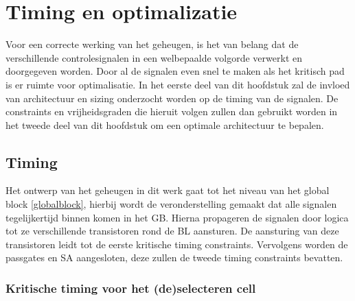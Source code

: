 \chapter{Timing en optimalizatie}
\label{timing-optimization}
Voor een correcte werking van het geheugen, is het van belang dat de verschillende controlesignalen in een welbepaalde volgorde verwerkt en doorgegeven worden.
Door al de signalen even snel te maken als het kritisch pad is er ruimte voor optimalisatie. In het eerste deel van dit hoofdstuk zal de invloed van architectuur en sizing onderzocht worden op de timing van de signalen. De constraints en vrijheidsgraden die hieruit volgen zullen dan gebruikt worden in het tweede deel van dit hoofdstuk om een optimale architectuur te bepalen.

\section{Timing}
\label{timing}
Het ontwerp van het geheugen in dit werk gaat tot het niveau van het global block \ref{globalblock}, hierbij wordt de veronderstelling gemaakt dat alle signalen tegelijkertijd binnen komen in het GB. Hierna propageren de signalen door logica tot ze verschillende transistoren rond de BL aansturen. De aansturing van deze transistoren leidt tot de eerste kritische timing constraints. Vervolgens worden de passgates en SA aangesloten, deze zullen de tweede timing constraints bevatten.

\subsection{Kritische timing voor het (de)selecteren cell}
\label{optimization}
